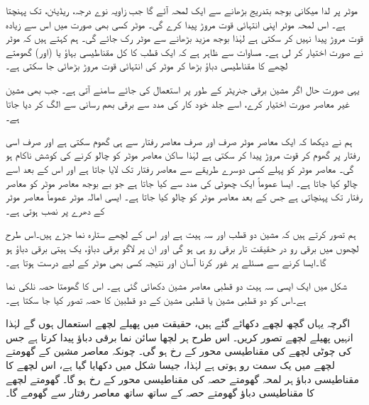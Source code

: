 موٹر پر لدا میکانی بوجھ بتدریج بڑھانے سے ایک لمحہ آئے گا  جب زاویہ  نوے درجہ،   ریڈیئن، تک پہنچتا ہے۔ اس لمحہ موٹر اپنی انتہائی قوت مروڑ  پیدا کرے  گی۔ موٹر کسی بھی صورت میں اس سے زیادہ قوت مروڑ پیدا نہیں کر سکتی ہے لہٰذا  بوجھ  مزید بڑھانے سے موٹر رک جائے گی۔ ہم کہتے ہیں کہ موٹر نے  صورت اختیار کر لی ہے۔ مساوات  سے ظاہر ہے کہ ایک قطب کا کل مقناطیسی بہاؤ یا (اور) گھومتے لچھے کا مقناطیسی دباؤ بڑھا کر موٹر کی  انتہائی قوت مروڑ  بڑھائی جا سکتی ہے۔

یہی صورت  حال اگر مشین برقی جنریٹر کے طور پر استعمال کی جائے سامنے آتی ہے۔ جب بھی مشین غیر معاصر صورت اختیار کرے،  اسے جلد خود کار   کی مدد سے برقی بھم  رسانی سے الگ کر دیا جاتا ہے۔

ہم نے دیکھا کہ ایک معاصر موٹر صرف اور صرف معاصر رفتار سے ہی گھوم سکتی ہے اور صرف اسی رفتار پر گھوم کر قوت مروڑ پیدا کر سکتی ہے لہٰذا ساکن معاصر موٹر کو  چالو  کرنے کی کوشش  ناکام ہو گی۔ معاصر موٹر کو پہلے کسی دوسرے طریقے سے معاصر رفتار تک لایا جاتا ہے اور اس کے بعد  اسے چالو کیا جاتا ہے۔ ایسا عموماً ایک چھوٹی   کی مدد سے کیا جاتا ہے جو بے بوجھ معاصر موٹر کو  معاصر رفتار تک پہنچاتی  ہے جس کے بعد معاصر موٹر کو چالو کیا جاتا ہے۔ ایسی امالہ موٹر عموماً معاصر موٹر کے دھرے پر نصب ہوتی ہے۔

 ہم تصور کرتے ہیں کہ مشین دو قطب اور سہ ہیت ہے اور اس کے لچھے ستارہ نما جڑے  ہیں۔اس طرح لچھوں میں برقی رو در حقیقت تار برقی رو ہی ہو گی اور ان پر لاگو برقی دباؤ، یک ہیتی  برقی دباؤ ہو گا۔ایسا کرنے سے مسئلے پر غور کرنا آسان  اور نتیجہ کسی بھی موٹر کے لیے درست ہوتا ہے۔

شکل   میں ایک ایسی سہ ہیت دو قطبی معاصر مشین دکھائی گئی ہے۔ اس کا گھومتا حصہ نلکی نما ہے۔اس کو دو قطبی مشین یا   قطبی مشین کے دو قطبین کا حصہ تصور کیا جا سکتا ہے۔

 اگرچہ یہاں گچھ لچھے دکھائے گئے ہیں، حقیقت میں پھیلے لچھے  استعمال ہوں گے لہٰذا انہیں  پھیلے لچھے تصور کریں۔ اس طرح ہر لچھا سائن نما برقی دباؤ پیدا کرتا ہے جس کی چوٹی لچھے کی مقناطیسی محور کے رخ ہو گی۔  چونکہ معاصر مشین کے گھومتے لچھے میں یک سمت  رو ہوتی ہے لہٰذا، جیسا شکل  میں دکھایا گیا ہے، اس لچھے  کا مقناطیسی دباؤ ہر لمحہ گھومتے حصہ کی مقناطیسی محور کے رخ ہو گا۔ گھومتے لچھے کا مقناطیسی دباؤ گھومتے حصہ کے ساتھ ساتھ معاصر رفتار سے گھومے گا۔

